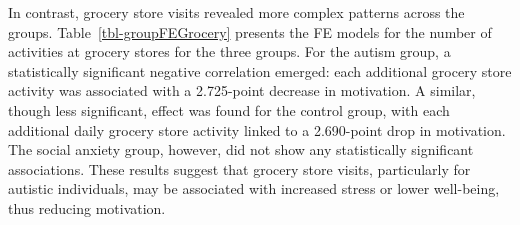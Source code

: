\documentclass[
  letterpaper,
  number,
  review,
  3p]{elsarticle}
\begin{document}
\begin{table}

\caption{\label{tbl-groupFEParks}FE Models: Motivation and Number of
Activities at Parks by Group}


\end{table}%

In contrast, grocery store visits revealed more complex patterns across
the groups. Table~\ref{tbl-groupFEGrocery} presents the FE models for
the number of activities at grocery stores for the three groups. For the
autism group, a statistically significant negative correlation emerged:
each additional grocery store activity was associated with a 2.725-point
decrease in motivation. A similar, though less significant, effect was
found for the control group, with each additional daily grocery store
activity linked to a 2.690-point drop in motivation. The social anxiety
group, however, did not show any statistically significant associations.
These results suggest that grocery store visits, particularly for
autistic individuals, may be associated with increased stress or lower
well-being, thus reducing motivation.
\end{document}
